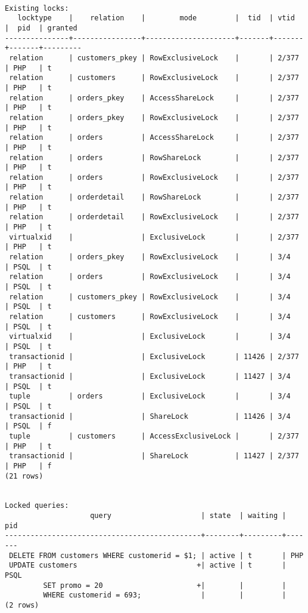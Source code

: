 \documentclass{article}
\begin{document}
\begin{Verbatim}[frame=lines]

Existing locks:
   locktype    |    relation    |        mode         |  tid  | vtid  |  pid  | granted
---------------+----------------+---------------------+-------+-------+-------+---------
 relation      | customers_pkey | RowExclusiveLock    |       | 2/377 | PHP   | t
 relation      | customers      | RowExclusiveLock    |       | 2/377 | PHP   | t
 relation      | orders_pkey    | AccessShareLock     |       | 2/377 | PHP   | t
 relation      | orders_pkey    | RowExclusiveLock    |       | 2/377 | PHP   | t
 relation      | orders         | AccessShareLock     |       | 2/377 | PHP   | t
 relation      | orders         | RowShareLock        |       | 2/377 | PHP   | t
 relation      | orders         | RowExclusiveLock    |       | 2/377 | PHP   | t
 relation      | orderdetail    | RowShareLock        |       | 2/377 | PHP   | t
 relation      | orderdetail    | RowExclusiveLock    |       | 2/377 | PHP   | t
 virtualxid    |                | ExclusiveLock       |       | 2/377 | PHP   | t
 relation      | orders_pkey    | RowExclusiveLock    |       | 3/4   | PSQL  | t
 relation      | orders         | RowExclusiveLock    |       | 3/4   | PSQL  | t
 relation      | customers_pkey | RowExclusiveLock    |       | 3/4   | PSQL  | t
 relation      | customers      | RowExclusiveLock    |       | 3/4   | PSQL  | t
 virtualxid    |                | ExclusiveLock       |       | 3/4   | PSQL  | t
 transactionid |                | ExclusiveLock       | 11426 | 2/377 | PHP   | t
 transactionid |                | ExclusiveLock       | 11427 | 3/4   | PSQL  | t
 tuple         | orders         | ExclusiveLock       |       | 3/4   | PSQL  | t
 transactionid |                | ShareLock           | 11426 | 3/4   | PSQL  | f
 tuple         | customers      | AccessExclusiveLock |       | 2/377 | PHP   | t
 transactionid |                | ShareLock           | 11427 | 2/377 | PHP   | f
(21 rows)


Locked queries:
                    query                     | state  | waiting |  pid
----------------------------------------------+--------+---------+-------
 DELETE FROM customers WHERE customerid = $1; | active | t       | PHP
 UPDATE customers                            +| active | t       | PSQL
         SET promo = 20                      +|        |         |
         WHERE customerid = 693;              |        |         |
(2 rows)
\end{Verbatim}
\end{document}
